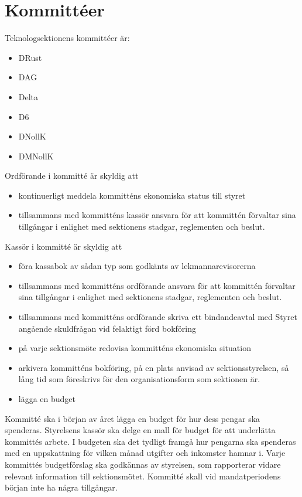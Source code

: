 \documentclass[a4paper]{dteklag}
\begin{document}
\section{Kommittéer}
\para Teknologsektionens kommittéer är:
\begin{itemize}
  \item DRust
  \item DAG
  \item Delta
  \item D6
  \item DNollK
  \item DMNollK
\end{itemize}
\para Ordförande i kommitté är skyldig att
\begin{itemize}
  \item kontinuerligt meddela kommitténs ekonomiska status till styret
  \item tillsammans med kommitténs kassör ansvara för att kommittén förvaltar sina tillgångar i enlighet med sektionens stadgar, reglementen och beslut.
\end{itemize}
\para Kassör i kommitté är skyldig att
\begin{itemize}
  \item föra kassabok av sådan typ som godkänts av lekmannarevisorerna
  \item tillsammans med kommitténs ordförande ansvara för att kommittén förvaltar sina tillgångar i enlighet med sektionens stadgar, reglementen och beslut.
  \item tillsammans med kommitténs ordförande skriva ett bindandeavtal med Styret angående skuldfrågan vid felaktigt förd bokföring
  \item på varje sektionsmöte redovisa kommitténs ekonomiska situation
  \item arkivera kommitténs bokföring, på en plats anvisad av sektionsstyrelsen, så lång tid som föreskrivs för den organisationsform som sektionen är.
  \item lägga en budget
\end{itemize}
\para Kommitté ska i början av året lägga en budget för hur dess pengar ska spenderas.
\stycke Styrelsens kassör ska delge en mall för budget för att underlätta kommittés arbete.
\stycke I budgeten ska det tydligt framgå hur pengarna ska spenderas med en uppskattning för vilken månad utgifter och inkomster hamnar i.
\para Varje kommittés budgetförslag ska godkännas av styrelsen, som rapporterar vidare relevant information till sektionsmötet.
\para Kommitté skall vid mandatperiodens början inte ha några tillgångar.
\end{document}
